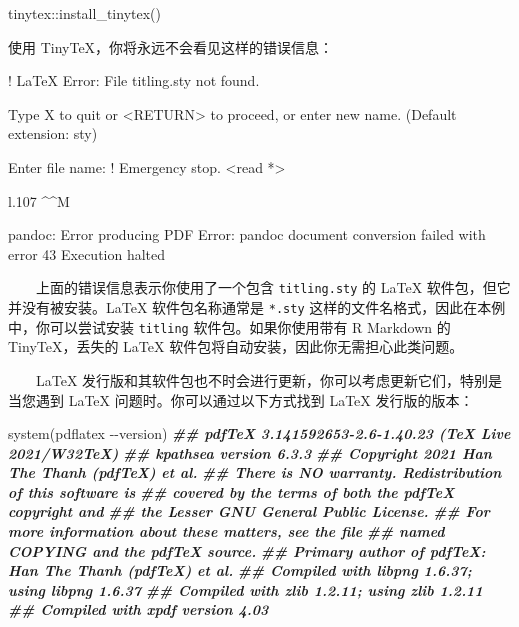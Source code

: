 \documentclass[
  12pt,
]{krantz}
\newenvironment{Shaded}{\begin{snugshade}}{\end{snugshade}}
\newcommand{\DocumentationTok}[1]{\textcolor[rgb]{0.56,0.35,0.01}{\textbf{\textit{#1}}}}
\newcommand{\FunctionTok}[1]{\textcolor[rgb]{0.00,0.00,0.00}{#1}}
\newcommand{\NormalTok}[1]{#1}
\newcommand{\SpecialCharTok}[1]{\textcolor[rgb]{0.00,0.00,0.00}{#1}}
\newcommand{\StringTok}[1]{\textcolor[rgb]{0.31,0.60,0.02}{#1}}
\theoremstyle{definition}
\theoremstyle{definition}
\theoremstyle{definition}
\theoremstyle{definition}
\theoremstyle{remark}
\begin{document}
\begin{Shaded}
\begin{Highlighting}[]
\NormalTok{tinytex}\SpecialCharTok{::}\FunctionTok{install\_tinytex}\NormalTok{()}
\end{Highlighting}
\end{Shaded}

使用 TinyTeX，你将永远不会看见这样的错误信息：

\begin{Shaded}
\begin{Highlighting}[]
\NormalTok{! LaTeX Error: File \textasciigrave{}titling.sty\textquotesingle{} not found.}

\NormalTok{Type X to quit or \textless{}RETURN\textgreater{} to proceed,}
\NormalTok{or enter new name. (Default extension: sty)}

\NormalTok{Enter file name: }
\NormalTok{! Emergency stop.}
\NormalTok{\textless{}read *\textgreater{} }
         
\NormalTok{l.107 \^{}\^{}M}

\NormalTok{pandoc: Error producing PDF}
\NormalTok{Error: pandoc document conversion failed with error 43}
\NormalTok{Execution halted}
\end{Highlighting}
\end{Shaded}

  上面的错误信息表示你使用了一个包含 \texttt{titling.sty} 的 LaTeX 软件包，但它并没有被安装。LaTeX 软件包名称通常是 \texttt{*.sty} 这样的文件名格式，因此在本例中，你可以尝试安装 \texttt{titling} 软件包。如果你使用带有 R Markdown 的 TinyTeX，丢失的 LaTeX 软件包将自动安装，因此你无需担心此类问题。

  LaTeX 发行版和其软件包也不时会进行更新，你可以考虑更新它们，特别是当您遇到 LaTeX 问题时。你可以通过以下方式找到 LaTeX 发行版的版本：

\begin{Shaded}
\begin{Highlighting}[]
\FunctionTok{system}\NormalTok{(}\StringTok{\textquotesingle{}pdflatex {-}{-}version\textquotesingle{}}\NormalTok{)}
\DocumentationTok{\#\# pdfTeX 3.141592653{-}2.6{-}1.40.23 (TeX Live 2021/W32TeX)}
\DocumentationTok{\#\# kpathsea version 6.3.3}
\DocumentationTok{\#\# Copyright 2021 Han The Thanh (pdfTeX) et al.}
\DocumentationTok{\#\# There is NO warranty.  Redistribution of this software is}
\DocumentationTok{\#\# covered by the terms of both the pdfTeX copyright and}
\DocumentationTok{\#\# the Lesser GNU General Public License.}
\DocumentationTok{\#\# For more information about these matters, see the file}
\DocumentationTok{\#\# named COPYING and the pdfTeX source.}
\DocumentationTok{\#\# Primary author of pdfTeX: Han The Thanh (pdfTeX) et al.}
\DocumentationTok{\#\# Compiled with libpng 1.6.37; using libpng 1.6.37}
\DocumentationTok{\#\# Compiled with zlib 1.2.11; using zlib 1.2.11}
\DocumentationTok{\#\# Compiled with xpdf version 4.03}
\end{Highlighting}
\end{Shaded}
\end{document}
